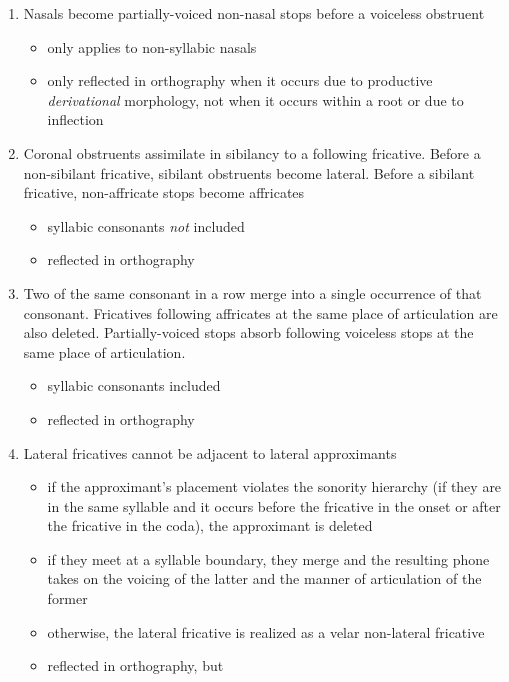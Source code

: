 \documentclass[a4paper,11pt,oneside,openany]{memoir}
\begin{document}
\begin{enumerate}
\begin{itemize}
    \end{itemize}
    \item Nasals become partially-voiced non-nasal stops before a voiceless obstruent
    \begin{itemize}
        \item only applies to non-syllabic nasals
        \item only reflected in orthography when it occurs due to productive \emph{derivational} morphology, not when it occurs within a root or due to inflection
    \end{itemize}
    \item Coronal obstruents assimilate in sibilancy to a following fricative. Before a non-sibilant fricative, sibilant obstruents become lateral. Before a sibilant fricative, non-affricate stops become affricates
    \begin{itemize}
        \item syllabic consonants \emph{not} included
        \item reflected in orthography
    \end{itemize}
    \item Two of the same consonant in a row merge into a single occurrence of that consonant. Fricatives following affricates at the same place of articulation are also deleted. Partially-voiced stops absorb following voiceless stops at the same place of articulation.
    \begin{itemize}
        \item syllabic consonants included
        \item reflected in orthography
    \end{itemize}
    \item Lateral fricatives cannot be adjacent to lateral approximants
    \begin{itemize}
        \item if the approximant's placement violates the sonority hierarchy (if they are in the same syllable and it occurs before the fricative in the onset or after the fricative in the coda), the approximant is deleted
        \item if they meet at a syllable boundary, they merge and the resulting phone takes on the voicing of the latter and the manner of articulation of the former
        \item otherwise, the lateral fricative is realized as a velar non-lateral fricative
        \item reflected in orthography, but 
    \end{itemize}
\end{enumerate}
\end{document}
